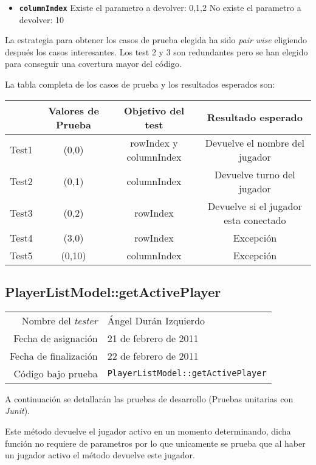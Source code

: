 \begin{itemize}
\item \textbf{\texttt{columnIndex}}
\subitem Existe el parametro a devolver: 0,1,2
\subitem No existe el parametro a devolver: 10
\end{itemize}

La estrategia para obtener los casos de prueba elegida ha sido
\textit{pair wise} eligiendo despu\'es los casos interesantes. Los test 2 y 3 son redundantes pero se han elegido
para conseguir una covertura mayor del c\'odigo.

La tabla completa de los casos de prueba y los resultados esperados son:

{\footnotesize
\begin{longtable}[c]{lccc}
 & \textbf{Valores de Prueba} & \textbf{Objetivo del test} & \textbf{Resultado esperado} \\
\hline \hline
\endhead

Test1 & (0,0) & rowIndex y columnIndex & Devuelve el nombre del jugador\\
Test2 & (0,1) & columnIndex & Devuelve turno del jugador\\
Test3 & (0,2) & rowIndex & Devuelve si el jugador esta conectado\\
Test4 & (3,0) & rowIndex  & Excepci\'on\\
Test5 & (0,10) & columnIndex & Excepci\'on\\

\hline
\end{longtable}
} 

\subsection{PlayerListModel::getActivePlayer}

{\small
\begin{tabular}{r|l}
Nombre del \textit{tester} & \'Angel Dur\'an Izquierdo\\
Fecha de asignación & 21 de febrero de 2011 \\
Fecha de finalización & 22 de febrero de 2011 \\
Código bajo prueba & \texttt{PlayerListModel::getActivePlayer}
\end{tabular}
}

A continuación se detallarán las pruebas de desarrollo (Pruebas unitarias con \textit{Junit}).

Este m\'etodo devuelve el jugador activo en un momento determinando, dicha funci\'on no requiere de parametros por lo que unicamente se prueba que al haber un jugador activo el m\'etodo devuelve este jugador.

